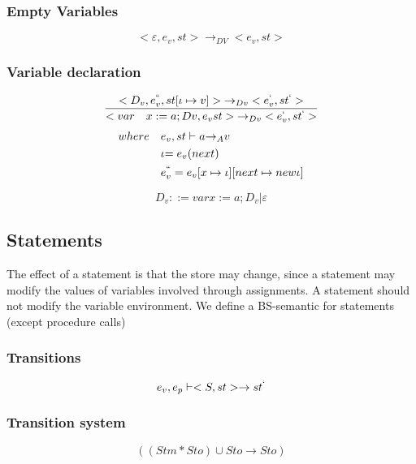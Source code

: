 \subsubsection{Empty Variables}
\begin{equation}
	<\varepsilon,{ e }_{ v },st>{ \rightarrow  }_{ DV }<{ e }_{ v },st>
\end{equation}


\subsubsection{Variable declaration}
\begin{equation}
	\frac { <{ D }_{ v },{ e }_{ v }^{ `` },st[\iota \mapsto v]>{ \rightarrow  }_{ Dv }<{ e }_{ v }^{ ` },{ st }^{ ` }> }{ <var\quad x:=a;Dv,{ e }_{ v }st>{ \rightarrow  }_{ Dv }<{ e }_{ v }^{ ` },{ st }^{ ` }> } 
\end{equation}
\begin{align*}
	where\quad &{ e }_{ v },st\vdash a{ \rightarrow  }_{ A }v \\
	&\iota {= e }_{ v }(next) \\
	&{ e }_{ v }^{ `` }={ e }_{ v }[x\mapsto \iota ][next\mapsto new \iota ]
\end{align*}

\begin{equation}
	{ D }_{ v }::=var x:=a; { D }_{ v } | \varepsilon
\end{equation}


\subsection*{Statements}
The effect of a statement is that the store may change, since a statement may modify the values of variables involved through assignments.
A statement should not modify the variable environment.
We define a BS-semantic for statements (except procedure calls)
\subsubsection{Transitions}
\begin{equation}
	{ e }_{ v },{ e }_{ p }\vdash <S,st>\rightarrow { st }^{ ` }
\end{equation}


\subsubsection{Transition system}
\begin{equation}
	{((Stm\ast  Sto)\cup Sto \rightarrow Sto) }
\end{equation}


